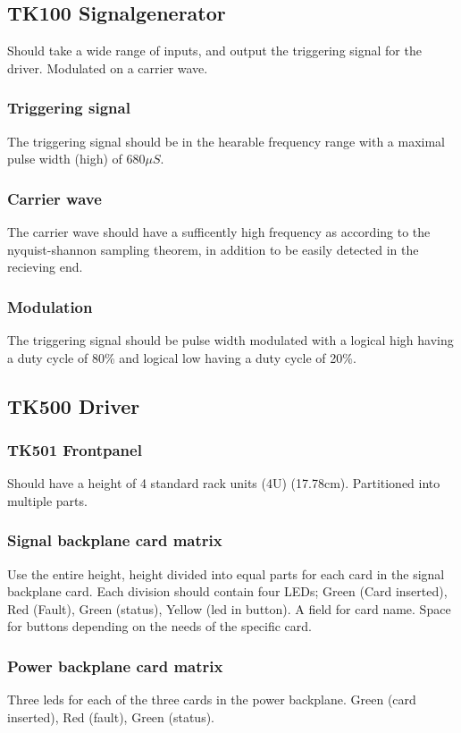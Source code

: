 \subsection{TK100 Signalgenerator}
Should take a wide range of inputs, and output the triggering signal for the driver. Modulated on a carrier wave.
\subsubsection{Triggering signal}
The triggering signal should be in the hearable frequency range with a maximal pulse width (high) of $680\mu S$.
\subsubsection{Carrier wave}
The carrier wave should have a sufficently high frequency as according to the nyquist-shannon sampling theorem, in addition to be easily detected in the recieving end.
\subsubsection{Modulation}
The triggering signal should be pulse width modulated with a logical high having a duty cycle of 80\% and logical low having a duty cycle of 20\%.

\subsection{TK500 Driver}

\subsubsection{TK501 Frontpanel}
Should have a height of 4 standard rack units (4U) (17.78cm). Partitioned into multiple parts.
\subsubsection{Signal backplane card matrix}
Use the entire height, height divided into equal parts for each card in the signal backplane card. Each division should contain four LEDs; Green (Card inserted), Red (Fault), Green (status), Yellow (led in button). A field for card name. Space for buttons depending on the needs of the specific card.

\subsubsection{Power backplane card matrix}
Three leds for each of the three cards in the power backplane. Green (card inserted), Red (fault), Green (status).

